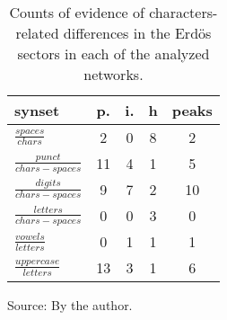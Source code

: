 \begin{table}[h!]
\begin{center}
\caption{Counts of evidence of characters-related differences in the Erd\"os sectors in each of the analyzed networks.}
	\def\arraystretch{1.5}
\begin{tabular}{| l || c | c | c || c |}\hline
{\bf synset} & {\bf p.} & {\bf i.} & {\bf h} & {\bf peaks} \\\hline\hline
$\frac{spaces}{chars}$ & 2  & 0  & 8  & 2 \\
$\frac{punct}{chars-spaces}$ & 11  & 4  & 1  & 5 \\
$\frac{digits}{chars-spaces}$ & 9  & 7  & 2  & 10 \\\hline
$\frac{letters}{chars-spaces}$ & 0  & 0  & 3  & 0 \\
$\frac{vowels}{letters}$ & 0  & 1  & 1  & 1 \\
$\frac{uppercase}{letters}$ & 13  & 3  & 1  & 6 \\\hline
\end{tabular}
\begin{flushleft}\footnotesize
		Source: By the author.\
\end{flushleft}
\end{center}
\end{table}
